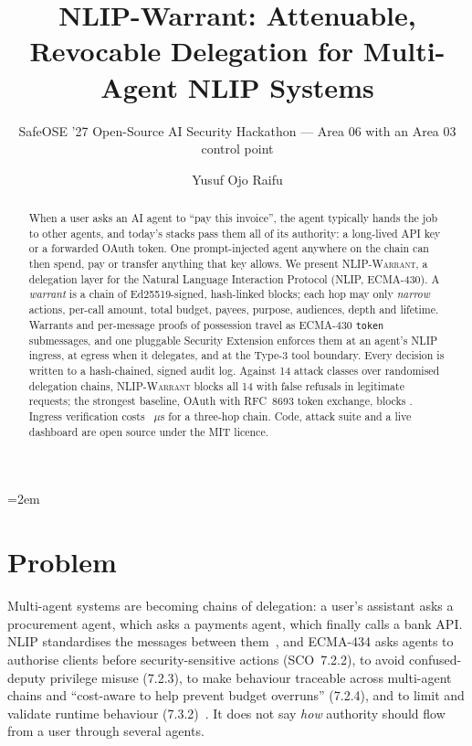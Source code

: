 \documentclass[sigconf,nonacm]{acmart}
\newcommand{\sys}{\textsc{NLIP-Warrant}}
\newcommand{\code}[1]{\texttt{\small #1}}
\begin{document}
\emergencystretch=2em
\title{NLIP-Warrant: Attenuable, Revocable Delegation for Multi-Agent NLIP Systems}
\subtitle{SafeOSE '27 Open-Source AI Security Hackathon --- Area 06 with an Area 03 control point}

\author{Yusuf Ojo Raifu}

\begin{abstract}
When a user asks an AI agent to ``pay this invoice'', the agent typically hands the job to other agents, and today's stacks pass them all of its authority: a long-lived API key or a forwarded OAuth token. One prompt-injected agent anywhere on the chain can then spend, pay or transfer anything that key allows. We present \sys{}, a delegation layer for the Natural Language Interaction Protocol (NLIP, ECMA-430). A \emph{warrant} is a chain of Ed25519-signed, hash-linked blocks; each hop may only \emph{narrow} actions, per-call amount, total budget, payees, purpose, audiences, depth and lifetime. Warrants and per-message proofs of possession travel as ECMA-430 \code{token} submessages, and one pluggable Security Extension enforces them at an agent's NLIP ingress, at egress when it delegates, and at the Type-3 tool boundary. Every decision is written to a hash-chained, signed audit log. Against 14 attack classes over \resTrials{} randomised delegation chains, \sys{} blocks all 14 with \resOursFalse{} false refusals in \resLegitRequests{} legitimate requests; the strongest baseline, OAuth with RFC~8693 token exchange, blocks \resBestBaselineBlocked. Ingress verification costs \resIngressThree~$\mu$s for a three-hop chain. Code, attack suite and a live dashboard are open source under the MIT licence.
\end{abstract}

\maketitle

\section{Problem}
Multi-agent systems are becoming chains of delegation: a user's assistant asks a procurement agent, which asks a payments agent, which finally calls a bank API. NLIP standardises the messages between them~\cite{ecma430,ecma431}, and ECMA-434 asks agents to authorise clients before security-sensitive actions (SCO~7.2.2), to avoid confused-deputy privilege misuse (7.2.3), to make behaviour traceable across multi-agent chains and ``cost-aware to help prevent budget overruns'' (7.2.4), and to limit and validate runtime behaviour (7.3.2)~\cite{ecma434}. It does not say \emph{how} authority should flow from a user through several agents.
\end{document}
